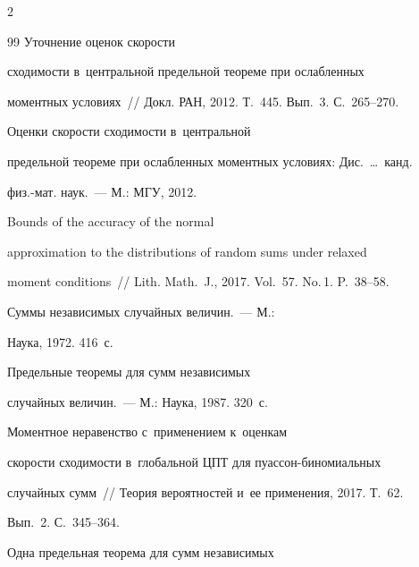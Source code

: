 \begin{multicols}{2}
{{\begin{thebibliography}{99}
 Уточнение оценок ско\-рости


сходимости в~центральной предельной тео\-ре\-ме при ослабленных


моментных условиях~// Докл. РАН, 2012. Т.~445. Вып.~3. С.~265--270.







 Оценки скорости сходимости в~центральной


предельной теореме при ослабленных моментных условиях: Дис.\ \ldots\ канд.


физ.-мат. наук.~--- М.: МГУ, 2012.







 Bounds of the accuracy of the normal


approximation to the distributions of random sums under relaxed


moment conditions~//  Lith. Math.~J., 2017. Vol.~57. No.\,1. P.~38--58.







 Суммы независимых случайных величин.~--- М.:


Наука, 1972. 416~с.







 Предельные теоремы для сумм независимых


случайных величин.~--- М.: Наука, 1987. 320~с.







 Моментное неравенство с~применением к~оценкам


скорости сходимости в~глобальной ЦПТ для пуас\-сон-би\-но\-ми\-аль\-ных


случайных сумм~// Тео\-рия вероятностей и~ее применения, 2017. Т.~62.


Вып.~2. С.~345--364.







 Одна предельная теорема для сумм независимых



\end{thebibliography}}}
\end{multicols}
